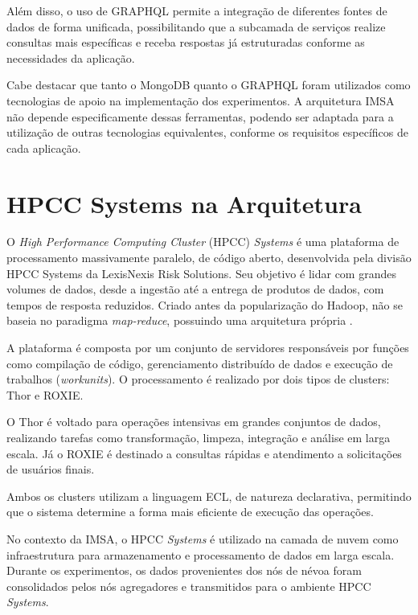 Além disso, o uso de \gls{GRAPHQL} permite a integração de diferentes fontes de dados de forma unificada, possibilitando que a subcamada de serviços realize consultas mais específicas e receba respostas já estruturadas conforme as necessidades da aplicação.

Cabe destacar que tanto o MongoDB quanto o \gls{GRAPHQL} foram utilizados como tecnologias de apoio na implementação dos experimentos. A arquitetura \gls{IMSA} não depende especificamente dessas ferramentas, podendo ser adaptada para a utilização de outras tecnologias equivalentes, conforme os requisitos específicos de cada aplicação.

\section{HPCC Systems na Arquitetura}

O \textit{High Performance Computing Cluster} (\gls{HPCC}) \textit{Systems} é uma plataforma de processamento massivamente paralelo, de código aberto, desenvolvida pela divisão \gls{HPCC} Systems da LexisNexis Risk Solutions. Seu objetivo é lidar com grandes volumes de dados, desde a ingestão até a entrega de produtos de dados, com tempos de resposta reduzidos. Criado antes da popularização do Hadoop, não se baseia no paradigma \textit{map-reduce}, possuindo uma arquitetura própria \cite{taylor2022}.

A plataforma é composta por um conjunto de servidores responsáveis por funções como compilação de código, gerenciamento distribuído de dados e execução de trabalhos (\textit{workunits}). O processamento é realizado por dois tipos de clusters: Thor e \gls{ROXIE}.

O Thor é voltado para operações intensivas em grandes conjuntos de dados, realizando tarefas como transformação, limpeza, integração e análise em larga escala. Já o \gls{ROXIE} é destinado a consultas rápidas e atendimento a solicitações de usuários finais.

Ambos os clusters utilizam a linguagem \gls{ECL}, de natureza declarativa, permitindo que o sistema determine a forma mais eficiente de execução das operações.

No contexto da \gls{IMSA}, o \gls{HPCC} \textit{Systems} é utilizado na camada de nuvem como infraestrutura para armazenamento e processamento de dados em larga escala. Durante os experimentos, os dados provenientes dos nós de névoa foram consolidados pelos nós agregadores e transmitidos para o ambiente \gls{HPCC} \textit{Systems}.

